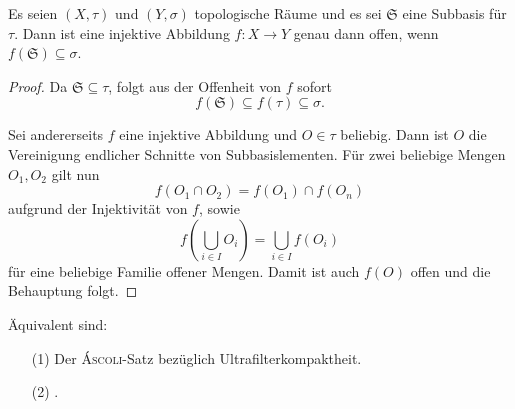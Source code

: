 \begin{lem}
  \label{lem:openmap}
  Es seien $(X,\tau)$ und $(Y,\sigma)$ topologische Räume und es sei $\mathfrak{S}$ eine Subbasis für $\tau$.  
  Dann ist eine injektive Abbildung $f \colon X \to Y$ genau dann offen, wenn $f(\mathfrak{S}) \subseteq \sigma$.
\end{lem}

\begin{proof}
  Da $\mathfrak{S} \subseteq \tau$, folgt aus der Offenheit von $f$ sofort 
  \begin{displaymath}
    f(\mathfrak{S}) \subseteq f(\tau) \subseteq \sigma.
  \end{displaymath}

  Sei andererseits $f$ eine injektive Abbildung und $O \in \tau$ beliebig.
  Dann ist $O$ die Vereinigung endlicher Schnitte von Subbasislementen.
  Für zwei beliebige Mengen $O_1,O_2$ gilt nun 
  \begin{displaymath}
    f(O_1 \cap O_2) = f(O_1) \cap f(O_n)
  \end{displaymath}
  aufgrund der Injektivität von $f$, sowie 
  \begin{displaymath}
    f \left(\bigcup_{i \in I} O_i \right) = \bigcup_{i \in I} f(O_i)
  \end{displaymath}
  für eine beliebige Familie offener Mengen.
  Damit ist auch $f(O)$ offen und die Behauptung folgt.
\end{proof}

\begin{thm}
  \label{thm:ultrafiltercompact}
  Äquivalent sind:
  \begin{enumerate}
    \item[(1)] Der \textsc{Áscoli}-Satz bezüglich Ultrafilterkompaktheit.
    \item[(2)] \PIT.
  \end{enumerate}
\end{thm}

